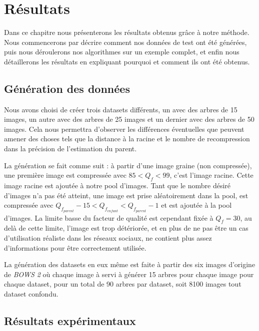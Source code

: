 \documentclass[utf8,final]{stageM2R} %
\begin{document}

\chapter{Résultats}
\label{chap4}

Dans ce chapitre nous présenterons les résultats obtenus grâce à notre méthode. Nous commencerons par décrire comment nos données de test ont été générées, puis nous déroulerons nos algorithmes sur un exemple complet, et enfin nous détaillerons les résultats en expliquant pourquoi et comment ils ont été obtenus.

\section{Génération des données}
Nous avons choisi de créer trois datasets différents, un avec des arbres de 15 images, un autre avec des arbres de 25 images et un dernier avec des arbres de 50 images. Cela nous permettra d'observer les différences éventuelles que peuvent amener des choses tels que la distance à la racine et le nombre de recompression dans la précision de l'estimation du parent.

La génération se fait comme suit : à partir d'une image graine (non compressée), une première image est compressée avec $85 < Q_f < 99$, c'est l'image racine. Cette image racine est ajoutée à notre pool d'images. Tant que le nombre désiré d'images n'a pas été atteint, une image est prise aléatoirement dans la pool, est compressée avec $Q_{f_{parent}} - 15 < Q_{f_{enfant}} < Q_{f_{parent}} - 1$ et est ajoutée à la pool d'images. La limite basse du facteur de qualité est cependant fixée à  $Q_f = 30$, au delà de cette limite, l'image est trop détériorée, et en plus de ne pas être un cas d'utilisation réaliste dans les réseaux sociaux, ne contient plus assez d'informations pour être correctement utilisée.

La génération des datasets en eux même est faite à partir des six images d'origine de \textit{BOWS 2}\autocite{bows} où chaque image à servi à générer 15 arbres pour chaque image pour chaque dataset, pour un total de 90 arbres par dataset, soit 8100 images tout dataset confondu.

\section{Résultats expérimentaux}
\end{document}
